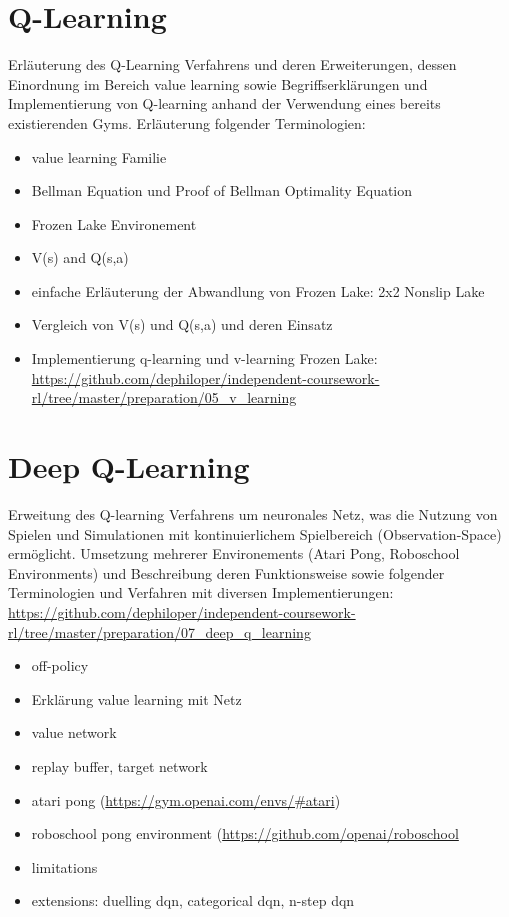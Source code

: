 \documentclass[11pt]{scrartcl}
\begin{document}
\section{Q-Learning}
Erläuterung des Q-Learning Verfahrens und deren Erweiterungen, dessen Einordnung im Bereich value learning sowie Begriffserklärungen und Implementierung von Q-learning anhand der Verwendung eines bereits existierenden Gyms. Erläuterung folgender Terminologien:

\begin{itemize}
\itemsep0pt
\item value learning Familie
\item Bellman Equation und Proof of Bellman Optimality Equation 
\item Frozen Lake Environement
\item V(s) and Q(s,a)
\item einfache Erläuterung der Abwandlung von Frozen Lake: 2x2 Nonslip Lake
\item Vergleich von V(s) und Q(s,a) und deren Einsatz
\item Implementierung q-learning und v-learning Frozen Lake:\\ \url{https://github.com/dephiloper/independent-coursework-rl/tree/master/preparation/05_v_learning}
\end{itemize}

\section{Deep Q-Learning}
Erweitung des Q-learning Verfahrens um neuronales Netz, was die Nutzung von Spielen und Simulationen mit kontinuierlichem Spielbereich (Observation-Space) ermöglicht. Umsetzung mehrerer Environements (Atari Pong, Roboschool Environments) und Beschreibung deren Funktionsweise sowie folgender Terminologien und Verfahren mit diversen Implementierungen: \\
\url{https://github.com/dephiloper/independent-coursework-rl/tree/master/preparation/07_deep_q_learning}

\begin{itemize}
\itemsep0pt
\item off-policy
\item Erklärung value learning mit Netz
\item value network
\item replay buffer, target network
\item atari pong (\url{https://gym.openai.com/envs/#atari})
\item roboschool pong environment (\url{https://github.com/openai/roboschool}
\item limitations
\item extensions: duelling dqn, categorical dqn, n-step dqn
\end{itemize}
\end{document}
